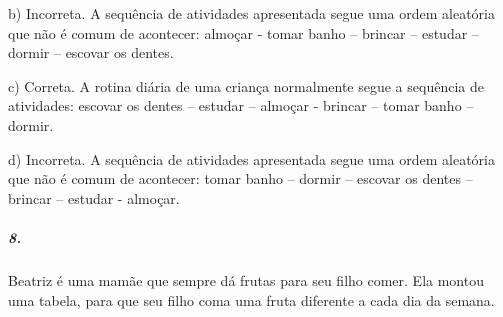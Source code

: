 b) Incorreta. A sequência de atividades apresentada segue uma ordem
aleatória que não é comum de acontecer: almoçar - tomar banho -- brincar
-- estudar -- dormir -- escovar os dentes.

c) Correta. A rotina diária de uma criança normalmente segue a sequência
de atividades: escovar os dentes -- estudar -- almoçar - brincar --
tomar banho -- dormir.

d) Incorreta. A sequência de atividades apresentada segue uma ordem
aleatória que não é comum de acontecer: tomar banho -- dormir -- escovar
os dentes -- brincar -- estudar - almoçar.

\subparagraph{8. }\label{section-137}

Beatriz é uma mamãe que sempre dá frutas para seu filho comer. Ela
montou uma tabela, para que seu filho coma uma fruta diferente a cada
dia da semana.

